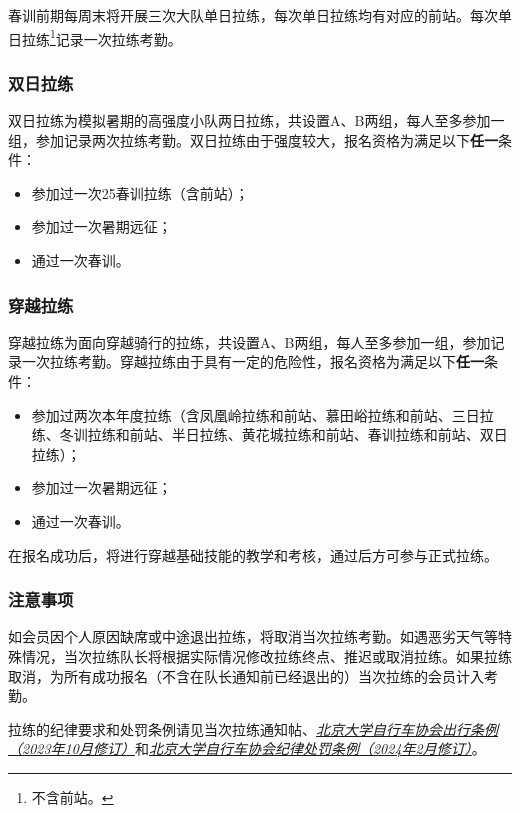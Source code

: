\documentclass[UTF8]{ctexart}
\begin{document}
春训前期每周末将开展三次大队单日拉练，每次单日拉练均有对应的前站。每次单日拉练\footnote{不含前站。}记录一次拉练考勤。



\subsubsection{双日拉练}

双日拉练为模拟暑期的高强度小队两日拉练，共设置A、B两组，每人至多参加一组，参加记录两次拉练考勤。双日拉练由于强度较大，报名资格为满足以下\textbf{任一}条件：
\begin{itemize}[nosep,left=4em]
    \item 参加过一次25春训拉练（含前站）；
    \item 参加过一次暑期远征；
    \item 通过一次春训。
\end{itemize}

\subsubsection{穿越拉练}

穿越拉练为面向穿越骑行的拉练，共设置A、B两组，每人至多参加一组，参加记录一次拉练考勤。穿越拉练由于具有一定的危险性，报名资格为满足以下\textbf{任一}条件：
\begin{itemize}[nosep,left=4em]
    \item 参加过两次本年度拉练（含凤凰岭拉练和前站、慕田峪拉练和前站、三日拉练、冬训拉练和前站、半日拉练、黄花城拉练和前站、春训拉练和前站、双日拉练）；
    \item 参加过一次暑期远征；
    \item 通过一次春训。
\end{itemize}

在报名成功后，将进行穿越基础技能的教学和考核，通过后方可参与正式拉练。

\subsubsection{注意事项}

如会员因个人原因缺席或中途退出拉练，将取消当次拉练考勤。如遇恶劣天气等特殊情况，当次拉练队长将根据实际情况修改拉练终点、推迟或取消拉练。如果拉练取消，为所有成功报名（不含在队长通知前已经退出的）当次拉练的会员计入考勤。


拉练的纪律要求和处罚条例请见当次拉练通知帖、\href{https://chexie.net/bbs/content/?bid=1&tid=9618&p=1}{\textit{北京大学自行车协会出行条例（2023年10月修订）}}和\href{https://chexie.net/bbs/content/?bid=1&tid=9751&p=1}{\textit{北京大学自行车协会纪律处罚条例（2024年2月修订）}}。
\end{document}
